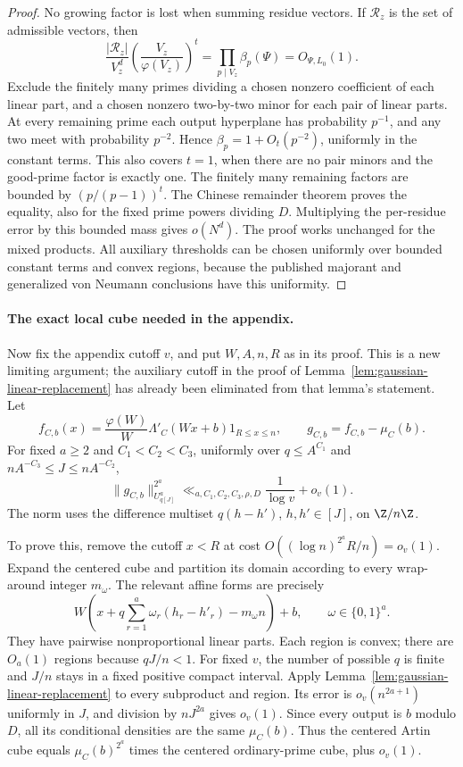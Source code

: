 \begin{proof}
No growing factor is lost when summing residue vectors. If
$\mathcal R_z$ is the set of admissible vectors, then
\begin{equation}\label{eq:gaussian-admissibility-mass}
 \frac{|\mathcal R_z|}{V_z^d}
       \left(\frac{V_z}{\varphi(V_z)}\right)^t
   =\prod_{p\mid V_z}\beta_p(\Psi)=O_{\Psi,L_0}(1).
\end{equation}
Exclude the finitely many primes dividing a chosen nonzero
coefficient of each linear part, and a chosen nonzero two-by-two
minor for each pair of linear parts. At every remaining prime each
output hyperplane has probability $p^{-1}$, and any two meet with
probability $p^{-2}$. Hence $\beta_p=1+O_t(p^{-2})$, uniformly in
the constant terms. This also covers $t=1$, when there are no pair
minors and the good-prime factor is exactly one.
The finitely many remaining factors are bounded by $(p/(p-1))^t$.
The Chinese remainder theorem proves the equality, also for the fixed
prime powers dividing $D$. Multiplying the per-residue error by this
bounded mass gives $o(N^d)$. The proof works unchanged for the mixed
products. All auxiliary thresholds can be chosen uniformly over bounded
constant terms and convex regions, because the published majorant and
generalized von Neumann conclusions have this uniformity.
\end{proof}

\paragraph{The exact local cube needed in the appendix.}
Now fix the appendix cutoff $v$, and put $W,A,n,R$ as in its proof.
This is a new limiting argument; the auxiliary cutoff in the proof of
Lemma~\ref{lem:gaussian-linear-replacement} has already been eliminated
from that lemma's statement. Let
\[
 f_{C,b}(x)=\frac{\varphi(W)}W\Lambda'_C(Wx+b)1_{R\leq x\leq n},
 \qquad g_{C,b}=f_{C,b}-\mu_C(b).
\]
For fixed $a\geq2$ and $C_1<C_2<C_3$, uniformly over
$q\leq A^{C_1}$ and $nA^{-C_3}\leq J\leq nA^{-C_2}$,
\begin{equation}\label{eq:gaussian-global-gowers}
 \|g_{C,b}\|_{U^a_{q[J]}}^{2^a}
       \ll_{a,C_1,C_2,C_3,\rho,D}\frac1{\log v}+o_v(1).
\end{equation}
The norm uses the difference multiset $q(h-h')$, $h,h'\in[J]$, on
$\Z/n\Z$.

To prove this, remove the cutoff $x<R$ at cost
$O((\log n)^{2^a}R/n)=o_v(1)$. Expand the centered cube and partition
its domain according to every wrap-around integer $m_\omega$.
The relevant affine forms are precisely
\[
 W\left(x+q\sum_{r=1}^a\omega_r(h_r-h'_r)-m_\omega n\right)+b,
 \qquad\omega\in\{0,1\}^a.
\]
They have pairwise nonproportional linear parts. Each region is convex;
there are $O_a(1)$ regions because $qJ/n<1$. For fixed $v$, the number
of possible $q$ is finite and $J/n$ stays in a fixed positive compact
interval. Apply Lemma~\ref{lem:gaussian-linear-replacement} to every
subproduct and region. Its error is $o_v(n^{2a+1})$ uniformly in $J$,
and division by $nJ^{2a}$ gives $o_v(1)$. Since every output is $b$
modulo $D$, all its conditional densities are the same $\mu_C(b)$.
Thus the centered Artin cube equals $\mu_C(b)^{2^a}$ times the
centered ordinary-prime cube, plus $o_v(1)$.

